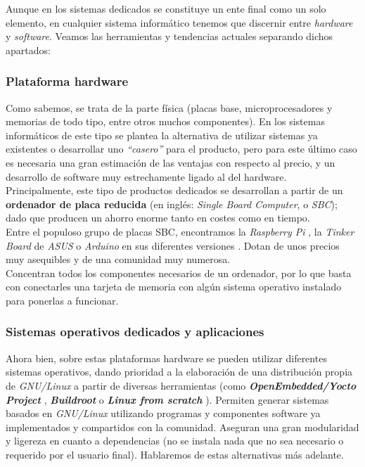 Aunque en los sistemas dedicados se constituye un ente final como un solo elemento, en cualquier sistema informático tenemos que discernir entre \textit{hardware} y \textit{software}. Veamos las herramientas y tendencias actuales separando dichos apartados:

\subsubsection{Plataforma hardware}

Como sabemos, se trata de la parte física (placas base, microprocesadores y memorias de todo tipo, entre otros muchos componentes). En los sistemas informáticos de este tipo se plantea la alternativa de utilizar sistemas ya existentes o desarrollar uno \textit{``casero''} para el producto, pero para este último caso es necesaria una gran estimación de las ventajas con respecto al precio, y un desarrollo de software muy estrechamente ligado al del hardware.\\

Principalmente, este tipo de productos dedicados se desarrollan a partir de un \textbf{ordenador de placa reducida} (en inglés: \textit{Single Board Computer}, o \textit{SBC}); dado que producen un ahorro enorme tanto en costes como en tiempo.\\

Entre el populoso grupo de placas SBC, encontramos la \textit{Raspberry Pi} \cite{raspberry-pi}, la \textit{Tinker Board} de \textit{ASUS} \cite{asus-tinkerboard} o \textit{Arduino} en sus diferentes versiones \cite{arduino-store}. Dotan de unos precios muy asequibles y de una comunidad muy numerosa.\\

Concentran todos los componentes necesarios de un ordenador, por lo que basta con conectarles una tarjeta de memoria con algún sistema operativo instalado para ponerlas a funcionar.\\

\subsubsection{Sistemas operativos dedicados y aplicaciones}

Ahora bien, sobre estas plataformas hardware se pueden utilizar diferentes sistemas operativos, dando prioridad a la elaboración de una distribución propia de \textit{GNU/Linux} a partir de diversas herramientas (como \textit{\textbf{OpenEmbedded/Yocto Project}} \cite{yocto-project}, \textit{\textbf{Buildroot}} \cite{buildroot} o \textit{\textbf{Linux from scratch}} \cite{linux-from-scratch}). Permiten generar sistemas basados en \textit{GNU/Linux} utilizando programas y componentes software ya implementados y compartidos con la comunidad. Aseguran una gran modularidad y ligereza en cuanto a dependencias (no se instala nada que no sea necesario o requerido por el usuario final). Hablaremos de estas alternativas más adelante.\\


